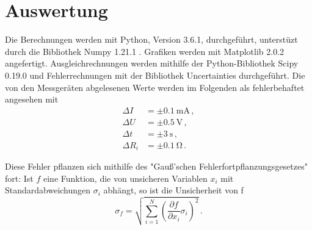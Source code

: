 \section{Auswertung}
\label{sec:Auswertung}
Die Berechnungen werden mit Python, Version 3.6.1, durchgeführt, unterstüzt durch die Bibliothek Numpy 1.21.1 \cite{numpy}. Grafiken werden mit Matplotlib 2.0.2 \cite{matplotlib} angefertigt.
Ausgleichrechnungen werden mithilfe der Python-Bibliothek Scipy 0.19.0 \cite{scipy}
und Fehlerrechnungen mit der Bibliothek Uncertainties \cite{uncertainties} durchgeführt.
Die von den Messgeräten abgelesenen Werte werden im Folgenden als fehlerbehaftet angesehen mit
\begin{align*}
  \Delta I &= \pm \SI{0.1}{\milli\ampere}\,, \\
  \Delta U &= \pm \SI{0.5}{\volt}\,, \\
  \Delta t &= \pm \SI{3}{\second}\,, \\
  \Delta R_i &= \pm \SI{0.1}{\ohm}\,.
\end{align*}

Diese Fehler pflanzen sich mithilfe des "Gauß'schen Fehlerfortpflanzungsgesetzes" fort:
Ist $f$ eine Funktion, die von unsicheren Variablen $x_i$ mit
Standardabweichungen $\sigma_i$ abhängt, so ist die Unsicherheit von f
\begin{equation*}
  \sigma_f = \sqrt{
    \sum\limits_{i = 1}^N
      \left( \frac{\partial f}{\partial x_i} \sigma_i \right)^{\!\! 2}
  }\,.
  \label{eqn:gaussfehler}
\end{equation*}


